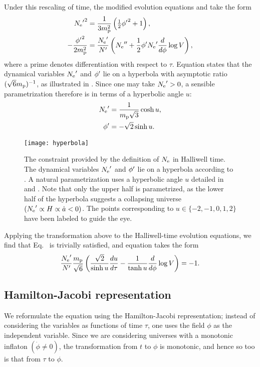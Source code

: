 Under this rescaling of time, the modified evolution equations
 and  take the form
%
\begin{align}
  {{N_\mathrm{e}}^\prime}^2 
  &= 
  \frac{1}{3m_{\mathrm{p}}^2}\left({\textstyle\frac{1}{2}}{{\phi}^\prime}^2 + 1 \right),
  \label{eqn:Friedmann_tau} 
  \\
  -\frac{{{\phi}^\prime}^2}{2m_{\mathrm{p}}^2} 
  &= 
  \frac{{{N_\mathrm{e}}^\prime}}{{{N}^\prime}}\left({{N_\mathrm{e}}^{\prime\prime}} 
  +\frac{1}{2} {{\phi}^\prime}{{N_\mathrm{e}}^\prime} \frac{d}{d\phi}\log V \right),  
  \label{eqn:Raychaudhuri_tau}
\end{align}
%
where a prime denotes differentiation with respect to $\tau$. 
Equation  states that
the dynamical variables ${{N_\mathrm{e}}^\prime}$ and ${{\phi}^\prime}$ lie on a hyperbola
with asymptotic ratio $(\sqrt{6}m_{\mathrm{p}})^{-1}$, as illustrated in
. Since one may take ${{N_\mathrm{e}}^\prime}>0$, a
sensible parametrization therefore is in terms of a hyperbolic angle
$u$:
%
\begin{align}
  {{N_\mathrm{e}}^\prime} 
  &= 
  \frac{1}{m_{\mathrm{p}}\sqrt{3}}\cosh u,
  \label{eqn:Ntrans}
  \\
  {{\phi}^\prime} 
  &= 
  -\sqrt{2}\sinh u.
  \label{eqn:phitrans}
\end{align}
%
%
\begin{figure}
  \texttt{[image: hyperbola]}
  \caption{The constraint provided by the definition of $N_\mathrm{e}$ in
    Halliwell time. The dynamical variables ${{N_\mathrm{e}}^\prime}$ and ${{\phi}^\prime}$
    lie on a hyperbola according to \protect{}. A
    natural parametrization uses a hyperbolic angle $u$ detailed in
    \protect{} and \protect{}. Note that
    only the upper half is parametrized, as the lower half of the
    hyperbola suggests a collapsing universe $({{N_\mathrm{e}}^\prime}\propto
    H\propto\dot{a}<0)$. The points corresponding to
    $u\in\{-2,-1,0,1,2\}$ have been labeled to guide the eye.}
    \label{fig:figure_hyperbola}
\end{figure}
%
Applying the transformation above to the Halliwell-time evolution
equations, we find that Eq.\  is
trivially satisfied, and equation  takes
the form
%
\begin{equation}
  \frac{{{N_\mathrm{e}}^\prime}}{{{N}^\prime}} \frac{m_{\mathrm{p}}}{\sqrt{6}}
  \left(\frac{\sqrt{2}}{\sinh u} \frac{du}{d\tau} 
  - \frac{1}{\tanh u} \frac{d}{d\phi}\log V\right) 
  = -1.
  \label{eqn:master_tau}
\end{equation}
%

\subsection{Hamilton-Jacobi representation}
\label{sec:Hamilton-Jacobi_representations}
We reformulate the equation using the Hamilton-Jacobi representation;
instead of considering the variables as functions of time $\tau$, one
uses the field $\phi$ as the independent variable. Since we are
considering universes with a monotonic inflaton $(\dot{\phi}\ne 0)$,
the transformation from $t$ to $\phi$ is monotonic, and hence so too
is that from $\tau$ to $\phi$.


